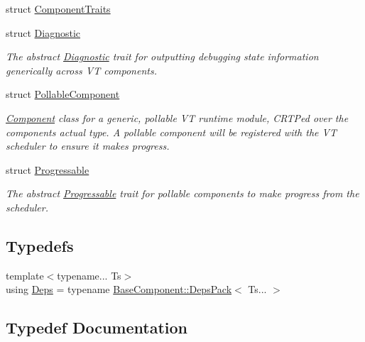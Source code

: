 \begin{DoxyCompactItemize}
struct \hyperlink{structvt_1_1runtime_1_1component_1_1_component_traits}{Component\+Traits}
\item 
struct \hyperlink{structvt_1_1runtime_1_1component_1_1_diagnostic}{Diagnostic}
\begin{DoxyCompactList}\small\item\em The abstract {\ttfamily \hyperlink{structvt_1_1runtime_1_1component_1_1_diagnostic}{Diagnostic}} trait for outputting debugging state information generically across VT components. \end{DoxyCompactList}\item 
struct \hyperlink{structvt_1_1runtime_1_1component_1_1_pollable_component}{Pollable\+Component}
\begin{DoxyCompactList}\small\item\em {\ttfamily \hyperlink{structvt_1_1runtime_1_1component_1_1_component}{Component}} class for a generic, pollable VT runtime module, C\+R\+TP\textquotesingle{}ed over the component\textquotesingle{}s actual type. A pollable component will be registered with the VT scheduler to ensure it makes progress. \end{DoxyCompactList}\item 
struct \hyperlink{structvt_1_1runtime_1_1component_1_1_progressable}{Progressable}
\begin{DoxyCompactList}\small\item\em The abstract {\ttfamily \hyperlink{structvt_1_1runtime_1_1component_1_1_progressable}{Progressable}} trait for pollable components to make progress from the scheduler. \end{DoxyCompactList}\end{DoxyCompactItemize}
\subsection*{Typedefs}
\begin{DoxyCompactItemize}
\item 
{\footnotesize template$<$typename... Ts$>$ }\\using \hyperlink{namespacevt_1_1runtime_1_1component_afad3a7a92e35d9ab3d81540d9275213c}{Deps} = typename \hyperlink{structvt_1_1runtime_1_1component_1_1_base_component_1_1_deps_pack}{Base\+Component\+::\+Deps\+Pack}$<$ Ts... $>$
\end{DoxyCompactItemize}


\subsection{Typedef Documentation}
\mbox{\label{namespacevt_1_1runtime_1_1component_afad3a7a92e35d9ab3d81540d9275213c}} 
